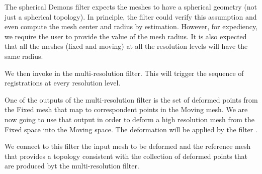 \documentclass{InsightArticle}
\begin{document}
\begin{center}

\end{center}

\begin{center}

\end{center}

The spherical Demons filter expects the meshes to have a spherical geometry
(not just a spherical topology). In principle, the filter could verify this
assumption and even compute the mesh center and radius by estimation. However,
for expediency, we require the user to provide the value of the mesh radius.
It is also expected that all the meshes (fixed and moving) at all the
resolution levels will have the same radius. 

\begin{center}

\end{center}

We then invoke  in the multi-resolution filter. This will trigger
the sequence of registrations at every resolution level.

\begin{center}

\end{center}

One of the outputs of the multi-resolution filter is the set of deformed points
from the Fixed mesh that map to correspondent points in the Moving mesh. We are
now going to use that output in order to deform a high resolution mesh from the
Fixed space into the Moving space. The deformation will be applied by the
filter .

\begin{center}

\end{center}

We connect to this filter the input mesh to be deformed and the reference mesh
that provides a topology consistent with the collection of deformed points that
are produced byt the multi-resolution filter.

\begin{center}

\end{center}
\end{document}
